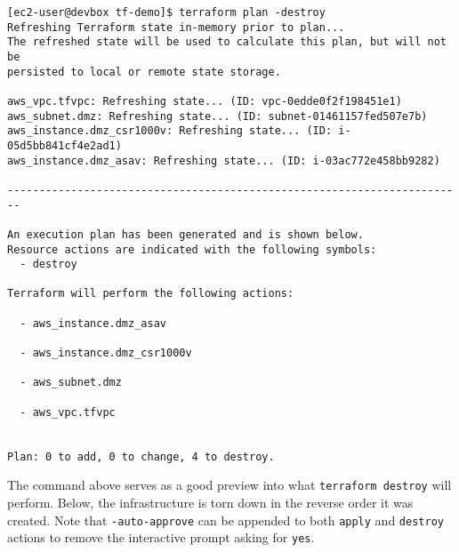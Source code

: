 \begin{verbatim}
[ec2-user@devbox tf-demo]$ terraform plan -destroy
Refreshing Terraform state in-memory prior to plan...
The refreshed state will be used to calculate this plan, but will not be
persisted to local or remote state storage.

aws_vpc.tfvpc: Refreshing state... (ID: vpc-0edde0f2f198451e1)
aws_subnet.dmz: Refreshing state... (ID: subnet-01461157fed507e7b)
aws_instance.dmz_csr1000v: Refreshing state... (ID: i-05d5bb841cf4e2ad1)
aws_instance.dmz_asav: Refreshing state... (ID: i-03ac772e458bb9282)

------------------------------------------------------------------------

An execution plan has been generated and is shown below.
Resource actions are indicated with the following symbols:
  - destroy

Terraform will perform the following actions:

  - aws_instance.dmz_asav

  - aws_instance.dmz_csr1000v

  - aws_subnet.dmz

  - aws_vpc.tfvpc


Plan: 0 to add, 0 to change, 4 to destroy.
\end{verbatim}

The command above serves as a good preview into what \verb|terraform destroy| will
perform. Below, the infrastructure is torn down in the reverse order it was
created. Note that \verb|-auto-approve| can be appended to both \verb|apply| and
\verb|destroy| actions to remove the interactive prompt asking for \verb|yes|.

